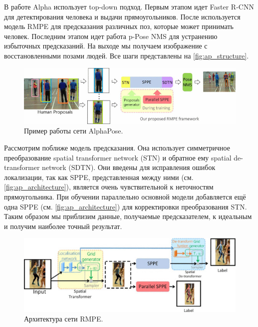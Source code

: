 В работе Alpha использует top-down подход. Первым этапом идет Faster R-CNN для детектирования человека и выдачи прямоугольников. После используется модель RMPE для предсказания различных поз, которые может принимать  человек. Последним этапом идет работа p-Pose NMS для устранению избыточных предсказаний. На выходе мы получаем изображение с восстановленными позами людей. Все шаги представлены на \autoref{fig:ap_structure}. \cite{fang2017rmpe}

\begin{figure}[h]
	\centering
	\includegraphics[width=\textwidth]{./images/AlphaPose_structure}
	\caption{Пример работы сети AlphaPose. \cite{fang2017rmpe}}
	\label{fig:ap_structure}
\end{figure}

Рассмотрим поближе модель предсказания. Она использует симметричное преобразование spatial transformer network (STN) и обратное ему spatial de-transformer network (SDTN). Они введены для исправления ошибок локализации, так как SPPE, представленная между ними (см. \autoref{fig:ap_architecture}), является очень чувствительной к неточностям прямоугольника. При обучении параллельно основной модели добавляется ещё одна SPPE (см. \autoref{fig:ap_architecture}) для корректировки преобразования STN. Таким образом мы приблизим данные, получаемые предсказателем, к идеальным и получим наиболее точный результат.

\begin{figure}[t]
	\centering
	\includegraphics[width=\textwidth]{./images/AlphaPose_architecture}
	\caption{Архитектура сети RMPE. \cite{fang2017rmpe}}
	\label{fig:ap_architecture}
\end{figure}



